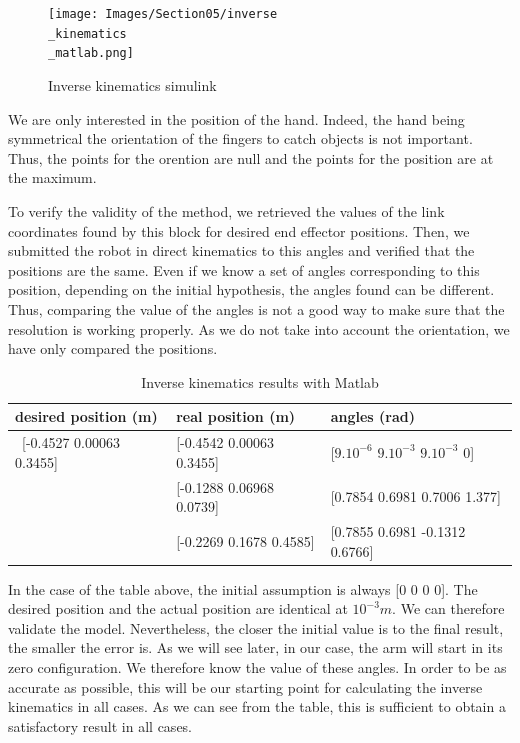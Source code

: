 \bigbreak
\begin{figure}[ht]
    \centering
    \texttt{[image: Images/Section05/inverse\\\_kinematics\\\_matlab.png]}
    \caption{Inverse kinematics simulink}
    \label{fig:InverseKinSimulink}
\end{figure}
\FloatBarrier

\bigbreak
We are only interested in the position of the hand. Indeed, the hand being symmetrical the orientation of the fingers to catch objects is not important. Thus, the points for the orention are null and the points for the position are at the maximum.

\bigbreak
To verify the validity of the method, we retrieved the values of the link coordinates found by this block for desired end effector positions. Then, we submitted the robot in direct kinematics to this angles and verified that the positions are the same. Even if we know a set of angles corresponding to this position, depending on the initial hypothesis, the angles found can be different. Thus, comparing the value of the angles is not a good way to make sure that the resolution is working properly. As we do not take into account the orientation, we have only compared the positions.

\begin{table}[ht]
    \centering
    \begin{tabular}{|p{4.5cm} | p{4.5cm} | p{5cm}|} 
        \hline
        \textbf{desired position (m)} & \textbf{real position (m)} & \textbf{angles (rad)}\\ [0.3ex] 
        \hline\
        [-0.4527 0.00063 0.3455] & [-0.4542 0.00063 0.3455] & [$9.10^{-6}$ $9.10^{-3}$ $9.10^{-3}$ 0] \\ 
        \hline
        [-0.1286 0.06948 0.07537] & [-0.1288 0.06968 0.0739] & [0.7854  0.6981 0.7006 1.377] \\ 
        \hline
        [-0.2259 0.1668 0.4583] & [-0.2269 0.1678 0.4585] & [0.7855  0.6981  -0.1312 0.6766] \\ 
        \hline
    \end{tabular}
    \caption{Inverse kinematics results with Matlab}
\end{table}
\FloatBarrier

\bigbreak
In the case of the table above, the initial assumption is always [0 0 0 0]. The desired position and the actual position are identical at $10^{-3}m$. We can therefore validate the model. Nevertheless, the closer the initial value is to the final result, the smaller the error is. As we will see later, in our case, the arm will start in its zero configuration. We therefore know the value of these angles. In order to be as accurate as possible, this will be our starting point for calculating the inverse kinematics in all cases. As we can see from the table, this is sufficient to obtain a satisfactory result in all cases.


